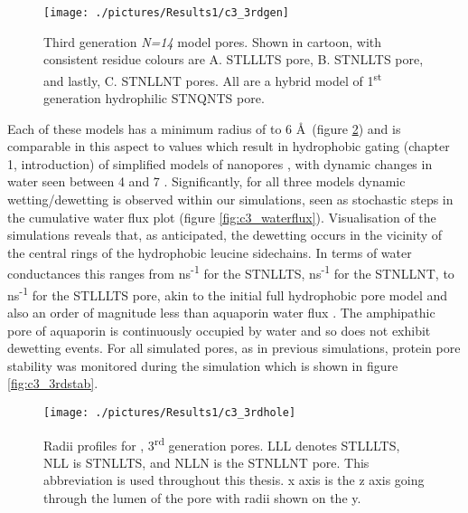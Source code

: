 \begin{figure}[H]
\begin{center}
\texttt{[image: ./pictures/Results1/c3\_3rdgen]}
\caption[Third generation \textit{N=14} model pores.] {Third generation \textit{N=14} model pores. Shown in cartoon, with consistent residue colours are A. STLLLTS pore, B. STNLLTS pore, and lastly, C. STNLLNT pores. All are a hybrid model of 1\textsuperscript{st} generation hydrophilic  STNQNTS pore.}
\label{fig:c3_3rdgen}
\end{center}
\end{figure}

Each of these models has a minimum radius of  to 6 \AA\ (figure \ref{fig:c3_3rdhole}) and is comparable in this aspect to values which result in hydrophobic gating (chapter 1, introduction) of simplified models of nanopores \cite{Beckstein2001}, with dynamic changes in water seen between 4 and 7 \angstrom . Significantly, for all three models dynamic wetting/dewetting is observed within our simulations, seen as stochastic steps in the cumulative water flux plot (figure \ref{fig:c3_waterflux}). Visualisation of the simulations reveals that, as anticipated, the dewetting occurs in the vicinity of the central rings of the hydrophobic leucine sidechains. In terms of water conductances this ranges from  ns\textsuperscript{-1} for the STNLLTS,  ns\textsuperscript{-1} for the STNLLNT,  to  ns\textsuperscript{-1} for the STLLLTS pore, akin to the initial full hydrophobic pore model and also an order of magnitude less than aquaporin water flux \cite{Borgnia1999,Zhu2004}. The amphipathic pore of aquaporin is continuously occupied by water and so does not exhibit dewetting events. For all simulated pores, as in previous simulations, protein pore stability was monitored during the simulation which is shown in figure \ref{fig:c3_3rdstab}.

\begin{figure}[H]
\begin{center}
\texttt{[image: ./pictures/Results1/c3\_3rdhole]}
\caption[Radii profiles for \textit{N=14}, 3\textsuperscript{rd} generation pores.] {Radii profiles for , 3\textsuperscript{rd} generation pores. LLL denotes STLLLTS, NLL is STNLLTS, and NLLN is the STNLLNT pore. This abbreviation is used throughout this thesis. x axis is the z axis going through the lumen of the pore with radii shown on the y.}
\label{fig:c3_3rdhole}
\end{center}
\end{figure}

